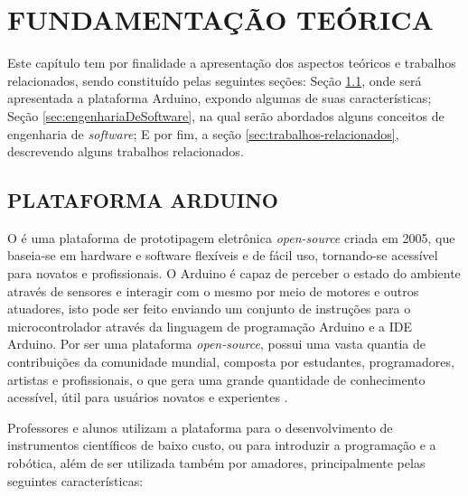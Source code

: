 
\chapter{FUNDAMENTAÇÃO TEÓRICA}
\label{chap:fundamentacao-teorica}Este capítulo tem por finalidade a apresentação dos aspectos teóricos e trabalhos relacionados, sendo constituído pelas seguintes seções: Seção \ref{sec:arduino}, onde será apresentada a plataforma Arduino, expondo algumas de suas características; Seção \ref{sec:engenhariaDeSoftware}, na qual serão abordados alguns conceitos de engenharia de \textit{software}; E por fim, a seção \ref{sec:trabalhos-relacionados}, descrevendo alguns trabalhos relacionados.

\section{PLATAFORMA ARDUINO}
\label{sec:arduino} O  é uma plataforma de prototipagem eletrônica \textit{open-source} criada em 2005, que baseia-se em hardware e software flexíveis e de fácil uso, tornando-se acessível para novatos e profissionais. O Arduino é capaz de perceber o estado do ambiente através de sensores e interagir com o mesmo por meio de motores e outros atuadores, isto pode ser feito enviando um conjunto de instruções para o microcontrolador através da linguagem de programação Arduino e a IDE Arduino. Por ser uma plataforma \textit{open-source}, possui uma vasta quantia de contribuições da comunidade mundial, composta por estudantes, programadores, artistas e profissionais, o que gera uma grande quantidade de conhecimento acessível, útil para usuários novatos e experientes \cite{Arduino2018}.

Professores e alunos utilizam a plataforma para o desenvolvimento de instrumentos científicos de baixo custo, ou para introduzir a programação e a robótica, além de ser utilizada também por amadores, principalmente pelas seguintes características: 

